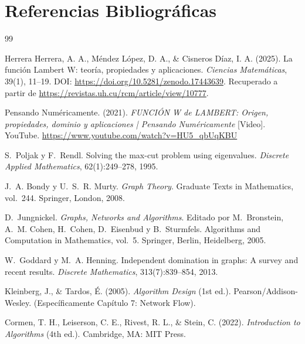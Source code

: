 \section{Referencias Bibliográficas}

\begin{thebibliography}{99}

Herrera Herrera, A. A., Méndez López, D. A., \& Cisneros Díaz, I. A. (2025). La función Lambert W: teoría, propiedades y aplicaciones. \textit{Ciencias Matemáticas}, 39(1), 11--19. DOI: \url{https://doi.org/10.5281/zenodo.17443639}. Recuperado a partir de \url{https://revistas.uh.cu/rcm/article/view/10777}.

Pensando Numéricamente. (2021). \textit{FUNCIÓN W de LAMBERT: Origen, propiedades, dominio y aplicaciones | Pensando Numéricamente} [Video]. YouTube. \url{https://www.youtube.com/watch?v=HU5_qbUqKBU}

S.~Poljak y F.~Rendl.
\newblock Solving the max-cut problem using eigenvalues.
\newblock \emph{Discrete Applied Mathematics}, 62(1):249--278, 1995.

J.~A. Bondy y U.~S.~R. Murty.
\newblock \emph{Graph Theory}.
\newblock Graduate Texts in Mathematics, vol.~244.
\newblock Springer, London, 2008.

D.~Jungnickel.
\newblock \emph{Graphs, Networks and Algorithms}.
\newblock Editado por M.~Bronstein, A.~M. Cohen, H.~Cohen, D.~Eisenbud y B.~Sturmfels.
\newblock Algorithms and Computation in Mathematics, vol.~5.
\newblock Springer, Berlin, Heidelberg, 2005.

W.~Goddard y M.~A. Henning.
\newblock Independent domination in graphs: A survey and recent results.
\newblock \emph{Discrete Mathematics}, 313(7):839--854, 2013.

Kleinberg, J., \& Tardos, É. (2005). \textit{Algorithm Design} (1st ed.). Pearson/Addison-Wesley. (Específicamente Capítulo 7: Network Flow).

Cormen, T. H., Leiserson, C. E., Rivest, R. L., \& Stein, C. (2022). \textit{Introduction to Algorithms} (4th ed.). Cambridge, MA: MIT Press.

\end{thebibliography}